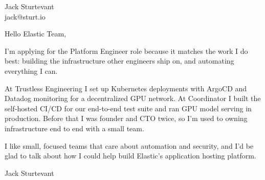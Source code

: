 \documentclass[11pt]{article}
\begin{document}
\raggedright

{\namefont\fontsize{20pt}{24pt}\selectfont Jack Sturtevant}\\[-0.3em]
jack@sturt.io

\vspace{1.2em}

Hello Elastic Team,

I'm applying for the Platform Engineer role because it matches the work I do best: building the infrastructure other engineers ship on, and automating everything I can.

At Trustless Engineering I set up Kubernetes deployments with ArgoCD and Datadog monitoring for a decentralized GPU network. At Coordinator I built the self-hosted CI/CD for our end-to-end test suite and ran GPU model serving in production. Before that I was founder and CTO twice, so I'm used to owning infrastructure end to end with a small team.

I like small, focused teams that care about automation and security, and I'd be glad to talk about how I could help build Elastic's application hosting platform.

\vspace{0.6em}
Jack Sturtevant
\end{document}
